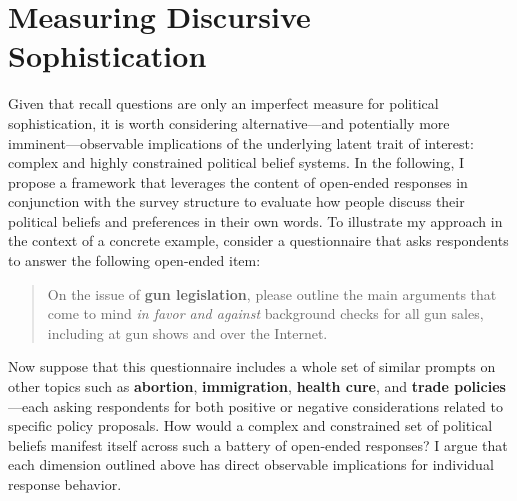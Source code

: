 \section*{Measuring Discursive Sophistication}


Given that recall questions are only an imperfect measure for political sophistication, it is worth considering alternative---and potentially more imminent---observable implications of the underlying latent trait of interest: complex and highly constrained political belief systems. In the following, I propose a framework that leverages the content of open-ended responses in conjunction with the survey structure to evaluate how people discuss their political beliefs and preferences in their own words. To illustrate my approach in the context of a concrete example, consider a questionnaire that asks respondents to answer the following open-ended item:

\begin{quote}
	On the issue of \textbf{gun legislation}, please outline the main arguments that come to mind \textit{in favor and against} background checks for all gun sales, including at gun shows and over the Internet.
\end{quote}

Now suppose that this questionnaire includes a whole set of similar prompts on other topics such as \textbf{abortion}, \textbf{immigration}, \textbf{health cure}, and \textbf{trade policies}---each asking respondents for both positive or negative considerations related to specific policy proposals. How would a complex and constrained set of political beliefs manifest itself across such a battery of open-ended responses? I argue that each dimension outlined above has direct observable implications for individual response behavior.

